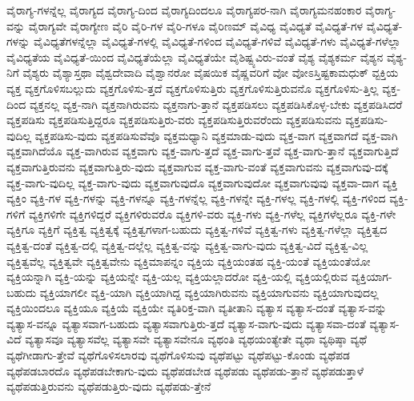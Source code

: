 {ವೈರಾಗ್ಯ-ಗಳನ್ನೆಲ್ಲ
ವೈರಾಗ್ಯದ
ವೈರಾಗ್ಯ-ದಿಂದ
ವೈರಾಗ್ಯದಿಂದಲೂ
ವೈರಾಗ್ಯಪರ-ನಾಗಿ
ವೈರಾಗ್ಯಮನಹಂಕಾರ
ವೈರಾಗ್ಯ-ವನ್ನು
ವೈರಾಗ್ಯವೇ
ವೈರಾಗ್ಯೇಣ
ವೈರಿ
ವೈರಿ-ಗಳ
ವೈರಿ-ಗಳೂ
ವೈರಿಣಮ್
ವೈವಿಧ್ಯ
ವೈವಿಧ್ಯತೆ
ವೈವಿಧ್ಯತೆ-ಗಳ
ವೈವಿಧ್ಯತೆ-ಗಳನ್ನು
ವೈವಿಧ್ಯತೆಗಳನ್ನೆಲ್ಲಾ
ವೈವಿಧ್ಯತೆ-ಗಳಲ್ಲಿ
ವೈವಿಧ್ಯತೆ-ಗಳಿಂದ
ವೈವಿಧ್ಯತೆ-ಗಳಿವೆ
ವೈವಿಧ್ಯತೆ-ಗಳು
ವೈವಿಧ್ಯತೆ-ಗಳೆಲ್ಲಾ
ವೈವಿಧ್ಯತೆಯ
ವೈವಿಧ್ಯತೆ-ಯಿಂದ
ವೈವಿಧ್ಯತೆಯೆಲ್ಲಾ
ವೈವಿಧ್ಯತೆಯೇ
ವೈಶಿಷ್ಟ್ಯವಿರು-ವಂತೆ
ವೈಶ್ಯ
ವೈಶ್ಯಕರ್ಮ
ವೈಶ್ಯನ
ವೈಶ್ಯ-ನಿಗೆ
ವೈಶ್ಯರು
ವೈಶ್ಯಾಸ್ತಥಾ
ವೈಶ್ವದೇವಾದಿ
ವೈಶ್ವಾನರೋ
ವೈಷಯಿಕ
ವೈಷ್ಣವರಿಗೆ
ವೋ
ವೋಽಸ್ತಿಷ್ಟಕಾಮಧುಕ್
ವ್ಟಕ್ತಿಯ
ವ್ಯಕ್ತ
ವ್ಯಕ್ತಗೊಳಿಸಬಲ್ಲುದು
ವ್ಯಕ್ತಗೊಳಿಸು-ತ್ತದೆ
ವ್ಯಕ್ತಗೊಳಿಸುತ್ತಿರು
ವ್ಯಕ್ತಗೊಳಿಸುತ್ತಿರುವನೊ
ವ್ಯಕ್ತಗೊಳಿಸು-ತ್ತಿಲ್ಲ
ವ್ಯಕ್ತ-ದಿಂದ
ವ್ಯಕ್ತನಲ್ಲ
ವ್ಯಕ್ತ-ನಾಗಿ
ವ್ಯಕ್ತನಾಗಿರುವನು
ವ್ಯಕ್ತನಾಗು-ತ್ತಾನೆ
ವ್ಯಕ್ತಪಡಿಸಲು
ವ್ಯಕ್ತಪಡಿಸಿಕೊಳ್ಳ-ಬೇಕು
ವ್ಯಕ್ತಪಡಿಸಿದರೆ
ವ್ಯಕ್ತಪಡಿಸು
ವ್ಯಕ್ತಪಡಿಸುತ್ತಿದ್ದರೂ
ವ್ಯಕ್ತಪಡಿಸುತ್ತಿರು-ವರು
ವ್ಯಕ್ತಪಡಿಸುತ್ತಿರುವರೆಂದು
ವ್ಯಕ್ತಪಡಿಸುವನು
ವ್ಯಕ್ತಪಡಿಸು-ವುದಿಲ್ಲ
ವ್ಯಕ್ತಪಡಿಸು-ವುದು
ವ್ಯಕ್ತಪಡಿಸುವೆವೊ
ವ್ಯಕ್ತಮಧ್ಯಾನಿ
ವ್ಯಕ್ತಮಾಡು-ವುದು
ವ್ಯಕ್ತ-ವಾಗ
ವ್ಯಕ್ತವಾಗದೆ
ವ್ಯಕ್ತ-ವಾಗಿ
ವ್ಯಕ್ತವಾಗಿದೆಯೊ
ವ್ಯಕ್ತ-ವಾಗಿರುವ
ವ್ಯಕ್ತವಾಗು
ವ್ಯಕ್ತ-ವಾಗು-ತ್ತದೆ
ವ್ಯಕ್ತ-ವಾಗು-ತ್ತವೆ
ವ್ಯಕ್ತ-ವಾಗು-ತ್ತಾನೆ
ವ್ಯಕ್ತವಾಗುತ್ತಿದೆ
ವ್ಯಕ್ತವಾಗುತ್ತಿರುವನು
ವ್ಯಕ್ತವಾಗುತ್ತಿರು-ವುದು
ವ್ಯಕ್ತವಾಗುವ
ವ್ಯಕ್ತ-ವಾಗು-ವಂತೆ
ವ್ಯಕ್ತವಾಗುವನು
ವ್ಯಕ್ತವಾಗುವು-ದಕ್ಕೆ
ವ್ಯಕ್ತ-ವಾಗು-ವುದಿಲ್ಲ
ವ್ಯಕ್ತ-ವಾಗು-ವುದು
ವ್ಯಕ್ತವಾಗುವುದೊ
ವ್ಯಕ್ತವಾಗುವುದೋ
ವ್ಯಕ್ತವಾಗುವುವು
ವ್ಯಕ್ತವಾ-ದಾಗ
ವ್ಯಕ್ತಿ
ವ್ಯಕ್ತಿಂ
ವ್ಯಕ್ತಿ-ಗಳ
ವ್ಯಕ್ತಿ-ಗಳನ್ನು
ವ್ಯಕ್ತಿ-ಗಳನ್ನೂ
ವ್ಯಕ್ತಿ-ಗಳನ್ನೆಲ್ಲ
ವ್ಯಕ್ತಿ-ಗಳನ್ನೇ
ವ್ಯಕ್ತಿ-ಗಳಲ್ಲ
ವ್ಯಕ್ತಿ-ಗಳಲ್ಲಿ
ವ್ಯಕ್ತಿ-ಗಳಿಂದ
ವ್ಯಕ್ತಿ-ಗಳಿಗೆ
ವ್ಯಕ್ತಿಗಳಿಗೇ
ವ್ಯಕ್ತಿಗಳಿದ್ದರೆ
ವ್ಯಕ್ತಿಗಳಿರುವರೊ
ವ್ಯಕ್ತಿಗಳಿ-ವರು
ವ್ಯಕ್ತಿ-ಗಳು
ವ್ಯಕ್ತಿ-ಗಳೆಲ್ಲ
ವ್ಯಕ್ತಿಗಳೆಲ್ಲರೂ
ವ್ಯಕ್ತಿ-ಗಳೇ
ವ್ಯಕ್ತಿಗೂ
ವ್ಯಕ್ತಿಗೆ
ವ್ಯಕ್ತಿತ್ವ
ವ್ಯಕ್ತಿತ್ವಕ್ಕೆ
ವ್ಯಕ್ತಿತ್ವಗಳಾಗ-ಬಹುದು
ವ್ಯಕ್ತಿತ್ವ-ಗಳಿವೆ
ವ್ಯಕ್ತಿತ್ವ-ಗಳು
ವ್ಯಕ್ತಿತ್ವ-ಗಳೆಲ್ಲಾ
ವ್ಯಕ್ತಿತ್ವದ
ವ್ಯಕ್ತಿತ್ವ-ದಂತೆ
ವ್ಯಕ್ತಿತ್ವ-ದಲ್ಲಿ
ವ್ಯಕ್ತಿತ್ವ-ದಲ್ಲೆಲ್ಲ
ವ್ಯಕ್ತಿತ್ವ-ವನ್ನು
ವ್ಯಕ್ತಿತ್ವ-ವಾಗು-ವುದು
ವ್ಯಕ್ತಿತ್ವ-ವಿದೆ
ವ್ಯಕ್ತಿತ್ವ-ವಿಲ್ಲ
ವ್ಯಕ್ತಿತ್ವವೆಲ್ಲ
ವ್ಯಕ್ತಿತ್ವವೇ
ವ್ಯಕ್ತಿತ್ವವೇನು
ವ್ಯಕ್ತಿಮಾಪನ್ನಂ
ವ್ಯಕ್ತಿಯ
ವ್ಯಕ್ತಿಯಂತಹ
ವ್ಯಕ್ತಿ-ಯಂತೆ
ವ್ಯಕ್ತಿಯಂತೆಯೋ
ವ್ಯಕ್ತಿಯನ್ನಾಗಿ
ವ್ಯಕ್ತಿ-ಯನ್ನು
ವ್ಯಕ್ತಿಯನ್ನೇ
ವ್ಯಕ್ತಿ-ಯಲ್ಲ
ವ್ಯಕ್ತಿಯಲ್ಲಾದರೋ
ವ್ಯಕ್ತಿ-ಯಲ್ಲಿ
ವ್ಯಕ್ತಿಯಲ್ಲಿರುವ
ವ್ಯಕ್ತಿಯಾಗ-ಬಹುದು
ವ್ಯಕ್ತಿಯಾಗಲೀ
ವ್ಯಕ್ತಿ-ಯಾಗಿ
ವ್ಯಕ್ತಿಯಾಗಿದ್ದ
ವ್ಯಕ್ತಿಯಾಗಿರುವನು
ವ್ಯಕ್ತಿಯಾಗುವನು
ವ್ಯಕ್ತಿಯಾಗುವುದಲ್ಲ
ವ್ಯಕ್ತಿಯಿಂದಲೂ
ವ್ಯಕ್ತಿಯೂ
ವ್ಯಕ್ತಿಯೆ
ವ್ಯಕ್ತಿಯೇ
ವ್ಯತಿರಿಕ್ತ-ವಾಗಿ
ವ್ಯತೀತಾನಿ
ವ್ಯತ್ಯಾಸ
ವ್ಯತ್ಯಾಸ-ದಂತೆ
ವ್ಯತ್ಯಾಸ-ವನ್ನು
ವ್ಯತ್ಯಾಸ-ವನ್ನೂ
ವ್ಯತ್ಯಾಸವಾಗ-ಬಹುದು
ವ್ಯತ್ಯಾಸವಾಗುತ್ತಿರು-ತ್ತದೆ
ವ್ಯತ್ಯಾಸ-ವಾಗು-ವುದು
ವ್ಯತ್ಯಾಸವಾ-ದಂತೆ
ವ್ಯತ್ಯಾಸ-ವಿದೆ
ವ್ಯತ್ಯಾಸವೂ
ವ್ಯತ್ಯಾಸವೆಲ್ಲ
ವ್ಯತ್ಯಾಸವೇ
ವ್ಯತ್ಯಾಸವೇನೂ
ವ್ಯಥಂತಿ
ವ್ಯಥಯಂತ್ಯೇತೇ
ವ್ಯಥಾ
ವ್ಯಥಿಷ್ಠಾ
ವ್ಯಥೆ
ವ್ಯಥೆಗೀಡಾಗು-ತ್ತೇವೆ
ವ್ಯಥೆಗೊಳಿಸಲಾರವು
ವ್ಯಥೆಗೊಳಿಸುವು
ವ್ಯಥೆಪಟ್ಟು
ವ್ಯಥೆಪಟ್ಟು-ಕೊಂಡು
ವ್ಯಥೆಪಡ
ವ್ಯಥೆಪಡಬಾರದೊ
ವ್ಯಥೆಪಡಬೇಕಾಗು-ವುದು
ವ್ಯಥೆಪಡಬೇಡ
ವ್ಯಥೆಪಡು
ವ್ಯಥೆಪಡು-ತ್ತಾನೆ
ವ್ಯಥೆಪಡುತ್ತಾಳೆ
ವ್ಯಥೆಪಡುತ್ತಿರುವನು
ವ್ಯಥೆಪಡುತ್ತಿರು-ವುದು
ವ್ಯಥೆಪಡು-ತ್ತೇನೆ
}
